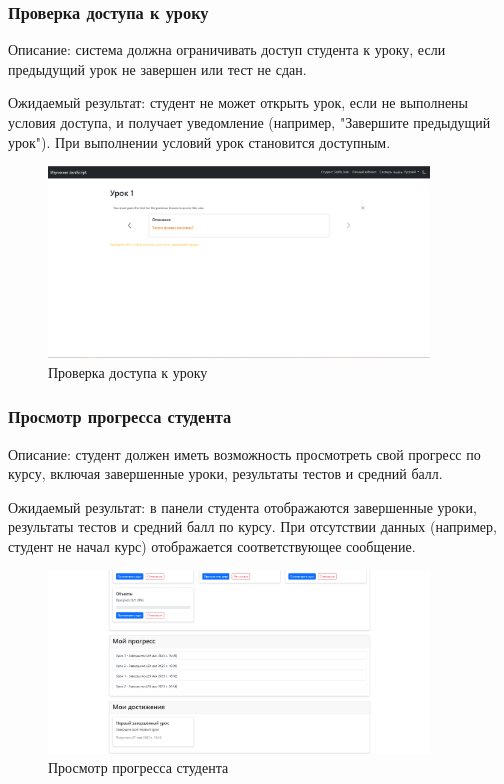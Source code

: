 \subsubsection{Проверка доступа к уроку}
	
Описание: система должна ограничивать доступ студента к уроку, если предыдущий урок не завершен или тест не сдан.
	
Ожидаемый результат: студент не может открыть урок, если не выполнены условия доступа, и получает уведомление (например, "Завершите предыдущий урок"). При выполнении условий урок становится доступным.
	
	\begin{figure}[ht]
		\centering
		\includegraphics[width=0.9\textwidth]{images/доступурок} 
		\caption{Проверка доступа к уроку}
		\label{access:image}
	\end{figure}
	
\subsubsection{Просмотр прогресса студента}
	
Описание: студент должен иметь возможность просмотреть свой прогресс по курсу, включая завершенные уроки, результаты тестов и средний балл.
	
Ожидаемый результат: в панели студента отображаются завершенные уроки, результаты тестов и средний балл по курсу. При отсутствии данных (например, студент не начал курс) отображается соответствующее сообщение.
	
	\begin{figure}[ht]
		\centering
		\includegraphics[width=0.9\textwidth]{images/прогресс} 
		\caption{Просмотр прогресса студента}
		\label{progress:image}
	\end{figure}
	

